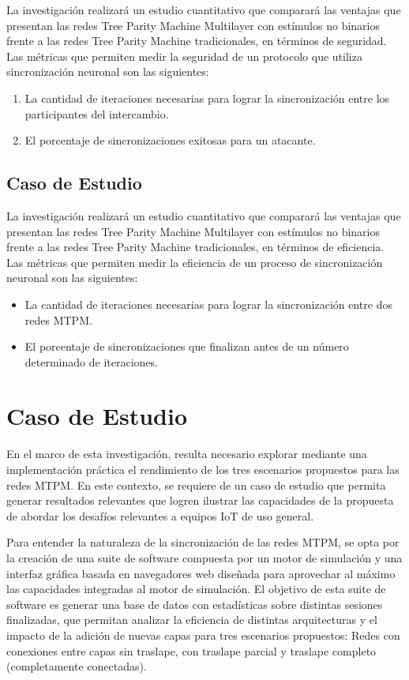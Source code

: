 La investigación realizará un estudio cuantitativo que comparará las ventajas que presentan las redes Tree Parity Machine Multilayer con estímulos no binarios frente a las redes Tree Parity Machine tradicionales, en términos de seguridad. Las métricas que permiten medir la seguridad de un protocolo que utiliza sincronización neuronal son las siguientes:
\begin{enumerate}
    \item La cantidad de iteraciones necesarias para lograr la sincronización entre los participantes del intercambio.
    \item El porcentaje de sincronizaciones exitosas para un atacante.
\end{enumerate}

\subsection{Caso de Estudio}
La investigación realizará un estudio cuantitativo que comparará las ventajas
que presentan las redes Tree Parity Machine Multilayer con estímulos no
binarios frente a las redes Tree Parity Machine tradicionales, en términos de
eficiencia. Las métricas que permiten medir la eficiencia de un proceso de sincronización neuronal son las siguientes:
\begin{itemize}
    \item La cantidad de iteraciones necesarias para lograr la sincronización entre dos redes MTPM.
    \item El porcentaje de sincronizaciones que finalizan antes de un número determinado de iteraciones.
\end{itemize}

\section{Caso de Estudio}
En el marco de esta investigación, resulta necesario explorar mediante
una implementación práctica el rendimiento de los tres escenarios propuestos para las redes MTPM.
En este contexto, se requiere de un caso de estudio que permita generar
resultados relevantes que logren ilustrar las capacidades de la propuesta de
abordar los desafíos relevantes a equipos IoT de uso general.

Para entender la naturaleza de la sincronización de las redes MTPM, se opta por la creación de una suite de software compuesta por un motor de simulación y una interfaz gráfica basada en navegadores web diseñada para aprovechar al máximo las capacidades integradas al motor de simulación. El objetivo de esta suite de software es generar una base de datos con estadísticas sobre distintas sesiones finalizadas, que permitan analizar la eficiencia de distintas arquitecturas y el impacto de la adición de nuevas capas para tres escenarios propuestos: Redes con conexiones entre capas sin traslape, con traslape parcial y traslape completo (completamente conectadas). 

